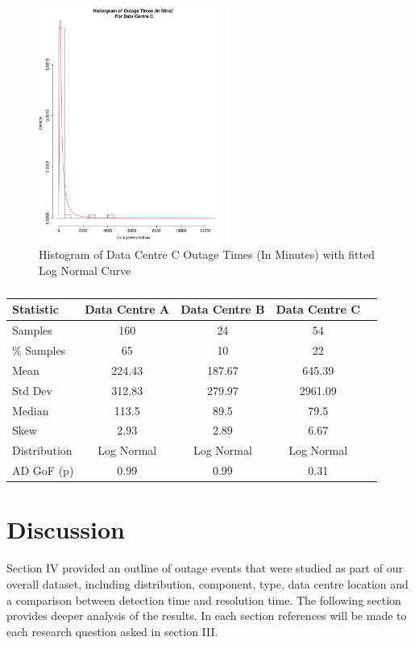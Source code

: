 \documentclass[conference]{IEEEtran}
\begin{document}
\begin{figure}
\begin{center}
\includegraphics[width=6cm]{graph13.pdf} 
\caption{ Histogram of  Data Centre C Outage Times (In Minutes) with fitted Log Normal Curve}
\end{center}
\label{fig:outagedistribution}
\end{figure}


\begin {table}
\caption {}
\begin{center}
\begin{tabular}{l*{3}{c}r} Statistic & Data Centre A & Data Centre B  & Data Centre C 
\\ \hline Samples & 160 & 24 & 54 
\\ \% Samples & 65 & 10 & 22
\\ Mean & 224.43	& 187.67	& 645.39
\\ Std Dev & 312.83	& 279.97	& 2961.09 
\\ Median & 113.5	& 89.5	& 79.5
\\ Skew & 2.93	& 2.89	& 6.67 
\\ Distribution & Log Normal & Log Normal & Log Normal  
\\AD GoF (p) & 0.99 & 0.99 & 0.31 
\end{tabular}
\end{center}
\end{table}


\section{Discussion}

Section IV provided an outline of outage events that were studied as part of our overall dataset, including distribution, component, type, data centre location and a comparison between detection time  and resolution time. The following section provides deeper analysis of the results. In each section references will be made to each research question asked in section III.
\end{document}
